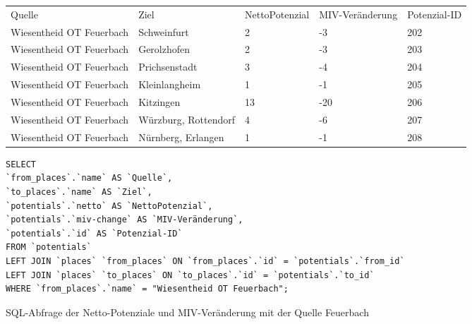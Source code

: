 \begin{tabularx}{\textwidth}{*5{X}}
Quelle & Ziel & NettoPotenzial & MIV-Veränderung & Potenzial-ID\\ 
Wiesentheid OT Feuerbach & Schweinfurt & 2 & -3 & 202\\ 
Wiesentheid OT Feuerbach & Gerolzhofen & 2 & -3 & 203\\ 
Wiesentheid OT Feuerbach & Prichsenstadt & 3 & -4 & 204\\ 
Wiesentheid OT Feuerbach & Kleinlangheim & 1 & -1 & 205\\ 
Wiesentheid OT Feuerbach & Kitzingen & 13 & -20 & 206\\ 
Wiesentheid OT Feuerbach & Würzburg, Rottendorf & 4 & -6 & 207\\ 
Wiesentheid OT Feuerbach & Nürnberg, Erlangen & 1 & -1 & 208\\ 
\end{tabularx}
\newline
\newline
\begin{listing}[htbp]
\begin{verbatim}
SELECT
`from_places`.`name` AS `Quelle`, 
`to_places`.`name` AS `Ziel`, 
`potentials`.`netto` AS `NettoPotenzial`, 
`potentials`.`miv-change` AS `MIV-Veränderung`, 
`potentials`.`id` AS `Potenzial-ID`
FROM `potentials`
LEFT JOIN `places` `from_places` ON `from_places`.`id` = `potentials`.`from_id`
LEFT JOIN `places` `to_places` ON `to_places`.`id` = `potentials`.`to_id`
WHERE `from_places`.`name` = "Wiesentheid OT Feuerbach";
\end{verbatim}
\caption{SQL-Abfrage der Netto-Potenziale und MIV-Veränderung mit der Quelle Feuerbach}\label{lst-fz-feuerbach}
\end{listing}